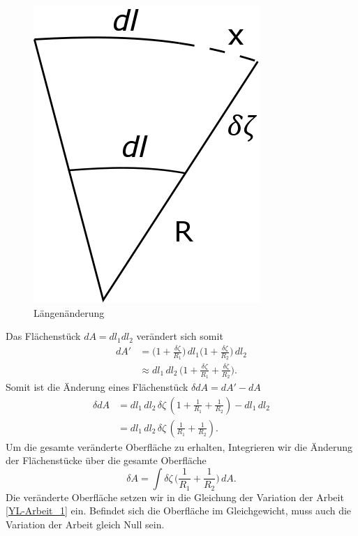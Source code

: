 \begin{refsection}
\begin{figure}
  \includegraphics[scale=0.3]{minimal/Langenanderung.png}
  \caption{Längenänderung} 
  \label{fig:Strahlensatz}
\end{figure}
Das Flächenstück $dA=dl_1 dl_2$ verändert sich somit
\begin{equation}
\begin{split}
dA' &= \bigg(1+\frac{\delta\zeta}{R_1}\bigg)\, dl_1 \bigg(1+\frac{\delta\zeta}{R_2}\bigg) \, dl_2 \\
&\approx dl_1\,dl_2\,\bigg(1+\frac{\delta\zeta}{R_1} + \frac{\delta\zeta}{R_2}\bigg).
\end{split}
\end{equation} 
Somit ist die Änderung eines Flächenstück $\delta dA=dA'-dA$
\begin{equation}
\begin{split}
\delta dA &= dl_1\,dl_2\,\delta\zeta\,(1+\frac{1}{R_1}+\frac{1}{R_2})-dl_1\,dl_2\\
&= dl_1\,dl_2\,\delta\zeta\,(\frac{1}{R_1}+\frac{1}{R_2}).
\end{split}
\end{equation}
Um die gesamte veränderte Oberfläche zu erhalten, Integrieren wir die Änderung der Flächenstücke über die gesamte Oberfläche
\begin{equation}
\delta A = \int \delta\zeta \, \bigg( \frac{1}{R_1}+\frac{1}{R_2} \bigg)\,dA.
\end{equation}
Die veränderte Oberfläche setzen wir in die Gleichung der Variation der Arbeit \ref{YL-Arbeit_1} ein. 
Befindet sich die Oberfläche im Gleichgewicht, muss auch die Variation der Arbeit gleich Null sein.

\end{refsection}
